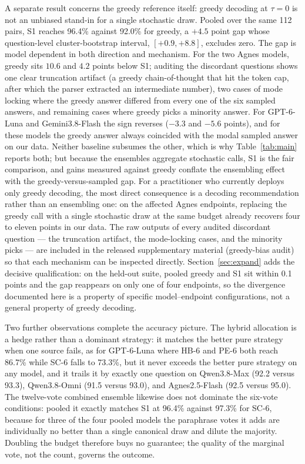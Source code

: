 A separate result concerns the greedy reference itself: greedy decoding at $\tau = 0$ is not an unbiased stand-in for a single stochastic draw. Pooled over the same 112 pairs, S1 reaches 96.4\% against 92.0\% for greedy, a $+4.5$ point gap whose question-level cluster-bootstrap interval, $[+0.9, +8.8]$, excludes zero. The gap is model dependent in both direction and mechanism. For the two Agnes models, greedy sits $10.6$ and $4.2$ points below S1; auditing the discordant questions shows one clear truncation artifact (a greedy chain-of-thought that hit the token cap, after which the parser extracted an intermediate number), two cases of mode locking where the greedy answer differed from every one of the six sampled answers, and remaining cases where greedy picks a minority answer. For GPT-6-Luna and Gemini3.8-Flash the sign reverses ($-3.3$ and $-5.6$ points), and for these models the greedy answer always coincided with the modal sampled answer on our data. Neither baseline subsumes the other, which is why Table~\ref{tab:main} reports both; but because the ensembles aggregate stochastic calls, S1 is the fair comparison, and gains measured against greedy conflate the ensembling effect with the greedy-versus-sampled gap. For a practitioner who currently deploys only greedy decoding, the most direct consequence is a decoding recommendation rather than an ensembling one: on the affected Agnes endpoints, replacing the greedy call with a single stochastic draw at the same budget already recovers four to eleven points in our data. The raw outputs of every audited discordant question --- the truncation artifact, the mode-locking cases, and the minority picks --- are included in the released supplementary material (greedy-bias audit) so that each mechanism can be inspected directly. Section~\ref{sec:expand} adds the decisive qualification: on the held-out suite, pooled greedy and S1 sit within 0.1 points and the gap reappears on only one of four endpoints, so the divergence documented here is a property of specific model--endpoint configurations, not a general property of greedy decoding.

Two further observations complete the accuracy picture. The hybrid allocation is a hedge rather than a dominant strategy: it matches the better pure strategy when one source fails, as for GPT-6-Luna where HB-6 and PE-6 both reach 86.7\% while SC-6 falls to 73.3\%, but it never exceeds the better pure strategy on any model, and it trails it by exactly one question on Qwen3.8-Max (92.2 versus 93.3), Qwen3.8-Omni (91.5 versus 93.0), and Agnes2.5-Flash (92.5 versus 95.0). The twelve-vote combined ensemble likewise does not dominate the six-vote conditions: pooled it exactly matches S1 at 96.4\% against 97.3\% for SC-6, because for three of the four pooled models the paraphrase votes it adds are individually no better than a single canonical draw and dilute the majority. Doubling the budget therefore buys no guarantee; the quality of the marginal vote, not the count, governs the outcome.

